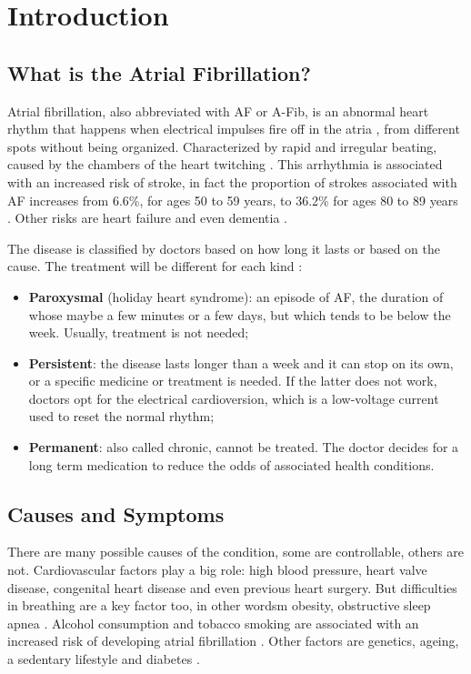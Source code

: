 \chapter{Introduction}
\label{sec:introduction}

\section{What is the Atrial Fibrillation?}
Atrial fibrillation, also abbreviated with AF or A-Fib, is an abnormal heart rhythm that happens when electrical impulses fire off in the atria , from different spots without being organized. Characterized by rapid and irregular beating, caused by the chambers of the heart twitching \cite{cdcgov17} . This arrhythmia is associated with an increased risk of stroke, in fact the proportion of strokes associated with AF increases from 6.6\%, for ages 50 to 59 years, to 36.2\% for ages 80 to 89 years \cite{10.1001/archinte.1987.00370090041008}. Other risks are heart failure and even dementia \cite{Munger2014}.


The disease is classified by doctors based on how long it lasts or based on the cause. The treatment will be different for each kind \cite{webmd2018}:
\begin{itemize}
  \item \textbf{Paroxysmal} (holiday heart syndrome): an episode of AF, the duration of whose maybe a few minutes or a few days, but which tends to be below the week. Usually, treatment is not needed;
  \item \textbf{Persistent}: the disease lasts longer than a week and it can stop on its own, or a specific medicine or treatment is needed. If the latter does not work, doctors opt for the electrical cardioversion, which is a low-voltage current used to reset the normal rhythm;
  \item \textbf{Permanent}: also called chronic, cannot be treated. The doctor decides for a long term medication to reduce the odds of associated health conditions.
\end{itemize}

\section{Causes and Symptoms}
There are many possible causes of the condition, some are controllable, others are not. Cardiovascular factors play a big role: high blood pressure, heart valve disease, congenital heart disease and even previous heart surgery. But difficulties in breathing are a key factor too, in other wordsm obesity, obstructive sleep apnea \cite{doi:10.1111/obr.12056}. Alcohol consumption and tobacco smoking are associated with an increased risk of developing atrial fibrillation \cite{Tonelo2013, DU20171968}. Other factors are genetics, ageing, a sedentary lifestyle and diabetes \cite{10.1001/jama.291.23.2851, Staerk2017}.

